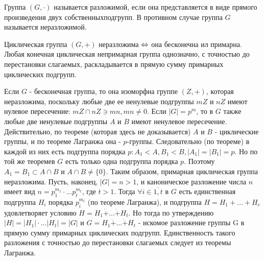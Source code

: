 \begin{defs}[Разложимость]
  Группа $(G, \cdot)$ называется разложимой, если она представляется в виде прямого произведения двух собственныхподгрупп.
  В противном случае группа $G$ называется неразложимой.
\end{defs}

\begin{proofs}
	Циклическая группа $(G, +)$ неразложима $\Leftrightarrow$ она бесконечна ил примарна. Любая конечная
  циклическая непримарная группа однозначно, с точностью до перестановки слагаемых, раскладывается в прямую сумму примарных
  циклических подгрупп.
	\begin{dokvo}
    Если $G$ - бесконечная группа, то она изоморфна группе $(Z, +)$, которая неразложима, поскольку
    любые две ее ненулевые подгруппы $mZ$ и $nZ$ имеют нулевое пересечение: $mZ \cap nZ \ni mn, mn \neq 0$.
    Если $|G| = p^m$, то в $G$ также любые две ненулевые подгруппы $A$ и $B$ имеют ненулевое пересечение.
    Действительно, по теореме (которая здесь не доказывается) $A$ и $B$ - циклические группы, и по теореме Лагранжа
    она - $p$-группы. Следовательно (по теореме) в каждой из них есть подгруппа порядка $p: A_1 < A, B_1 < B,
    |A_1| = |B_1| = p$. Но по той же теоремев $G$ есть только одна подгруппа порядка $p$. Поэтому $A_1 = B_1 \subset A \cap B$ и
    $A \cap B \neq \{0\}$. Таким образом, примарная циклическая группа неразложима.
    Пусть, наконец, $|G| = n > 1$, и каноническое разложение числа $n$ имеет вид $n = p_1^{m_1} \cdot \ldots p_t^{m_t}$, где
    $t > 1$. Тогда $\forall i \in \overline{1,t}$ в $G$ есть единственная подгруппа $H_i$ порядка $p_i^{m_i}$ (по теореме Лагранжа),
    и подгруппа $H = H_1 + \ldots + H_{e}$ удовлетворяет условию $H = H_1 \dot{+} \ldots \dot{+} H_t$. Но тогда по утверждению
    $|H| = |H_1| \cdot \ldots |H_t| = |G|$ и $G = H_1 \dot{+} \ldots \dot{+} H_t$ - искомое разложение группы G в прямую сумму примарных циклических подгрупп.
    Единственность такого разложения с точностью до перестановки слагаемых следует из теоремы Лагранжа.

	\end{dokvo}
\end{proofs}
\newpage
